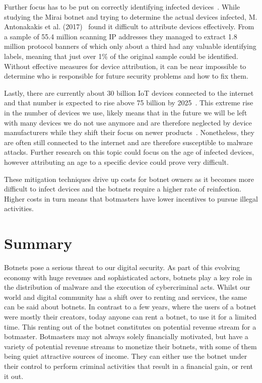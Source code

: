 Further focus has to be put on correctly identifying infected devices~\cite{Antonakakis17}.
While studying the Mirai botnet and trying to determine the actual devices infected, M. Antonakakis et al. (2017)~\cite{Antonakakis17} found it difficult to attribute devices effectively.
From a sample of 55.4 million scanning IP addresses they managed to extract 1.8 million protocol banners of which only about a third had any valuable identifying labels, meaning that just over 1\% of the original sample could be identified.
Without effective measures for device attribution, it can be near impossible to determine who is responsible for future security problems and how to fix them.

Lastly, there are currently about 30 billion IoT devices connected to the internet and that number is expected to rise above 75 billion by 2025~\cite{Statista}.
This extreme rise in the number of devices we use, likely means that in the future we will be left with many devices we do not use anymore and are therefore neglected by device manufacturers while they shift their focus on newer products~\cite{Antonakakis17}.
Nonetheless, they are often still connected to the internet and are therefore susceptible to malware attacks.
Further research on this topic could focus on the age of infected devices, however attributing an age to a specific device could prove very difficult.

These mitigation techniques drive up costs for botnet owners as it becomes more difficult to infect devices and the botnets require a higher rate of reinfection.
Higher costs in turn means that botmasters have lower incentives to pursue illegal activities.


\section{Summary}
Botnets pose a serious threat to our digital security.
As part of this evolving economy with huge revenues and sophisticated actors, botnets play a key role in the distribution of malware and the execution of cybercriminal acts.
Whilst our world and digital community has a shift over to renting and services, the same can be said about botnets.
In contrast to a few years, where the users of a botnet were mostly their creators, today anyone can rent a botnet, to use it for a limited time.
This renting out of the botnet constitutes on potential revenue stream for a botmaster.
Botmasters may not always solely financially motivated, but have a variety of potential revenue streams to monetize their botnets, with some of them being quiet attractive sources of income.
They can either use the botnet under their control to perform criminal activities that result in a financial gain, or rent it out.

